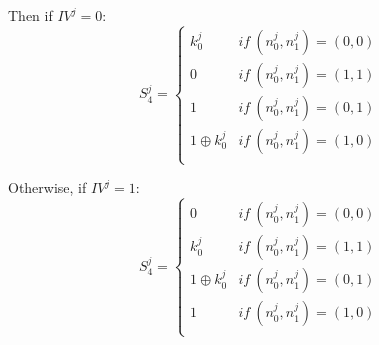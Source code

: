 \documentclass[a4paper,11pt,twocolumn]{article}
\begin{document}
	\noindent Then if $IV^j = 0$: 
	$$S _4^j =\left \{	
	\begin{array}{ll}
		k_0^j& if\ (n_0^j,n_1^j)=(0,0)\\
		0& if\ (n_0^j,n_1^j)=(1,1)\\
		1& if\ (n_0^j,n_1^j)=(0,1)\\
		1 \oplus k_0^j& if\ (n_0^j,n_1^j)=(1,0)\\
	\end{array}
	\right.$$
	
	\noindent Otherwise, if $IV^j = 1$:
	$$S _4^j =\left \{	
	\begin{array}{ll}
		0& if\ (n_0^j,n_1^j)=(0,0)\\
		k_0^j& if\ (n_0^j,n_1^j)=(1,1)\\
		1 \oplus k_0^j& if\ (n_0^j,n_1^j)=(0,1)\\
		1& if\ (n_0^j,n_1^j)=(1,0)\\
	\end{array}
	\right.$$
	
\end{document}
